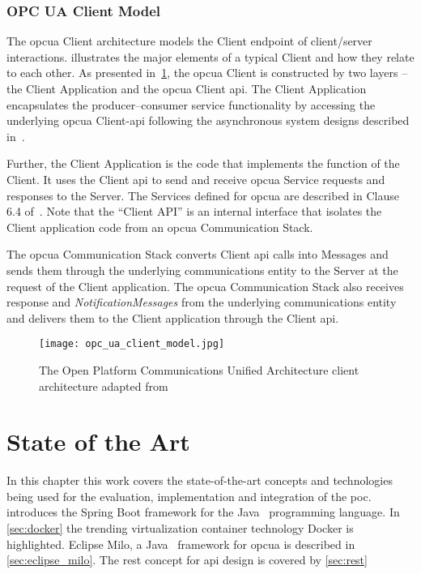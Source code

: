 \documentclass[
a4paper,
twoside,
headsepline,
cleardoublepage=empty,
parskip=half,
draft=false
]{scrbook}
\begin{document}
			\subsection{OPC UA Client Model}\label{subsec:opc_ua_client_model}

				The \gls{opcua} Client architecture models the Client endpoint of client/server interactions.
				 illustrates the major elements of a typical Client and how they relate to each other.
				As presented in~\cref{fig:opc_ua_client_model}, the \gls{opcua} Client is constructed by two layers -- the Client Application and the \gls{opcua} Client \gls{api}. The Client Application encapsulates the producer–consumer service functionality by accessing the underlying \gls{opcua} Client-\gls{api} following the asynchronous system designs described in~\cite{tanenbaum2007distributed}.
				
				Further, the Client Application is the code that implements the function of the Client.
				It uses the Client \gls{api} to send and receive \gls{opcua} Service requests and responses to the Server.
				The Services defined for \gls{opcua} are described in Clause 6.4 of~\cite{opcfoundation2017part4}.
				Note that the ``Client API'' is an internal interface that isolates the Client application code from an \gls{opcua} Communication Stack.
				
				The \gls{opcua} Communication Stack converts Client \gls{api} calls into Messages and sends them through the underlying communications entity to the Server at the request of the Client application.
				The \gls{opcua} Communication Stack also receives response and \textit{NotificationMessages} from the underlying communications entity and delivers them to the Client application through the Client \gls{api}.

				\begin{figure}[htbp]
					\centering
					\texttt{[image: opc\_ua\_client\_model.jpg]}
					\caption{The Open Platform Communications Unified Architecture client architecture adapted from~\cite{opcfoundation2017part1}}
					\label{fig:opc_ua_client_model}
				\end{figure}

	\chapter{State of the Art}\label{ch:state_of_the_art}
	
		In this chapter this work covers the state-of-the-art concepts and technologies being used for the evaluation, implementation and integration of the \gls{poc}.  introduces the Spring Boot framework for the Java~\cite{java2015} programming language. In \cref{sec:docker} the trending virtualization container technology Docker is highlighted. Eclipse Milo, a Java~\cite{java2015} framework for \gls{opcua} is described in \cref{sec:eclipse_milo}. The \gls{rest} concept for \gls{api} design is covered by \cref{sec:rest}
\end{document}
